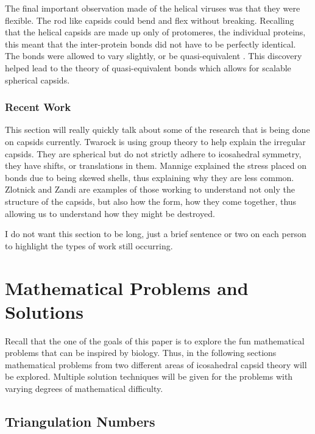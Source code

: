 \documentclass[12pt,letter]{article}
\begin{document}
The final important observation made of the helical viruses was that they were flexible. The rod like capsids could bend and flex without breaking. Recalling that the helical capsids are made up only of protomeres, the individual proteins, this meant that the inter-protein bonds did not have to be perfectly identical. The bonds were allowed to vary slightly, or be quasi-equivalent \cite[p 7]{Caspar:1962}. This discovery helped lead to the theory of quasi-equivalent bonds which allows for scalable spherical capsids.

\subsubsection{Recent Work}
This section will really quickly talk about some of the research that is being done on capsids currently. Twarock \cite{Twarock:2004} \cite{Twarock:2006} is using group theory to help explain the irregular capsids. They are spherical but do not strictly adhere to icosahedral symmetry, they have shifts, or translations in them. Mannige \cite{Mannige:2009} explained the stress placed on bonds due to being skewed shells, thus explaining why they are less common. Zlotnick \cite{Zlotnick:2005} and Zandi \cite{Zandi:2004} are examples of those working to understand not only the structure of the capsids, but also how the form, how they come together, thus allowing us to understand how they might be destroyed.

I do not want this section to be long, just a brief sentence or two on each person to highlight the types of work still occurring.

\section{Mathematical Problems and Solutions} %
Recall that the one of the goals of this paper is to explore the fun mathematical problems that can be inspired by biology. Thus, in the following sections mathematical problems from two different areas of icosahedral capsid theory will be explored. Multiple solution techniques will be given for the problems with varying degrees of mathematical difficulty.

\subsection{Triangulation Numbers} %
\end{document}
